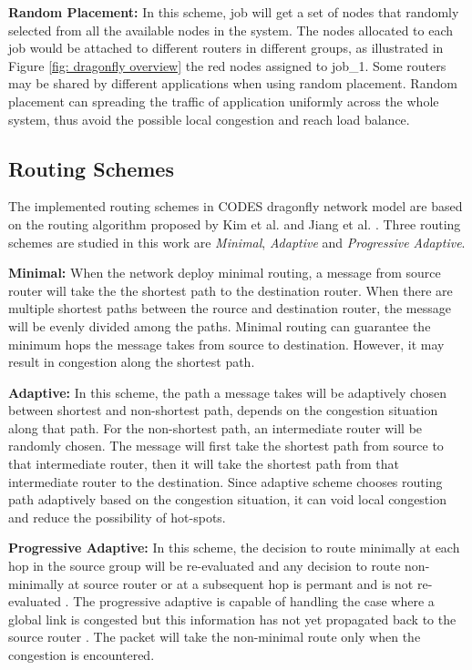 \documentclass[conference,compsoc]{IEEEtran}
\begin{document}
\textbf{Random Placement:} In this scheme, job will get a set of nodes that randomly selected from all the available nodes in the system. The nodes allocated to each job would be attached to different routers in different groups, as illustrated in Figure \ref{fig: dragonfly overview} the red nodes assigned to job\_1. Some routers may be shared by different applications when using random placement. Random placement can spreading the traffic of application uniformly across the whole system, thus avoid the possible local congestion and reach load balance.


\subsection{Routing Schemes}
\label{sec:routing}

The implemented routing schemes in CODES dragonfly network model are based on the routing algorithm proposed by Kim et al. \cite{dally-dragonfly} and Jiang et al. \cite{jiang}. Three routing schemes are studied in this work are \emph{Minimal}, \emph{Adaptive} and \emph{Progressive Adaptive}.

\textbf{Minimal:} When the network deploy minimal routing, a message from source router will take the the shortest path to the destination router. When there are multiple shortest paths between the rource and destination router, the message will be evenly divided among the paths. Minimal routing can guarantee the minimum hops the message takes from source to destination. However, it may result in congestion along the shortest path. 


\textbf{Adaptive:} In this scheme, the path a message takes will be adaptively chosen between shortest and non-shortest path, depends on the congestion situation along that path. For the non-shortest path, an intermediate router will be randomly chosen. The message will first take the shortest path from source to that intermediate router, then it will take the shortest path from that intermediate router to the destination. Since adaptive scheme chooses routing path adaptively based on the congestion situation, it can void local congestion and reduce the possibility of hot-spots. 

\textbf{Progressive Adaptive:} In this scheme, the decision to route minimally at each hop in the source group will be re-evaluated and any decision to route non-minimally at source router or at a subsequent hop is permant and is not re-evaluated \cite{jiang}. The progressive adaptive is capable of handling the case where a global link is congested but this information has not yet propagated back to the source router \cite{jiang}. The packet will take the non-minimal route only when the congestion is encountered. 
\end{document}
